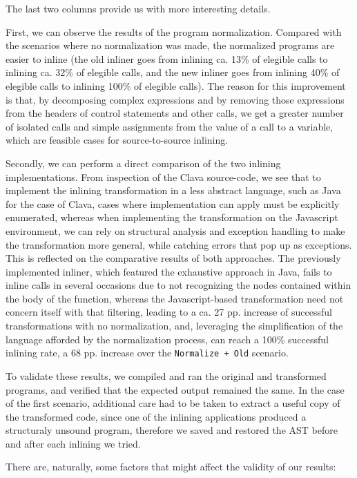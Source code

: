 The last two columns provide us with more interesting details.

First, we can observe the results of the program normalization. Compared with the scenarios where no normalization was made, the normalized programs are easier to inline (the old inliner goes from inlining ca. 13\% of elegible calls to inlining ca. 32\% of elegible calls, and the new inliner goes from inlining 40\% of elegible calls to inlining 100\% of elegible calls). The reason for this improvement is that, by decomposing complex expressions and by removing those expressions from the headers of control statements and other calls, we get a greater number of isolated calls and simple assignments from the value of a call to a variable, which are feasible cases for source-to-source inlining.

Secondly, we can perform a direct comparison of the two inlining implementations. From inspection of the Clava source-code, we see that to implement the inlining transformation in a less abstract language, such as Java for the case of Clava, cases where implementation can apply must be explicitly enumerated, whereas when implementing the transformation on the Javascript environment, we can rely on structural analysis and exception handling to make the transformation more general, while catching errors that pop up as exceptions. This is reflected on the comparative results of both approaches. The previously implemented inliner, which featured the exhaustive approach in Java, fails to inline calls in several occasions due to not recognizing the nodes contained within the body of the function, whereas the Javascript-based transformation need not concern itself with that filtering, leading to a ca. 27 pp. increase of successful transformations with no normalization, and, leveraging the simplification of the language afforded by the normalization process, can reach a 100\% successful inlining rate, a 68 pp. increase over the \texttt{Normalize + Old} scenario.

To validate these results, we compiled and ran the original and transformed programs, and verified that the expected output remained the same. In the case of the first scenario, additional care had to be taken to extract a useful copy of the transformed code, since one of the inlining applications produced a structuraly unsound program, therefore we saved and restored the AST before and after each inlining we tried.

There are, naturally, some factors that might affect the validity of our results:


